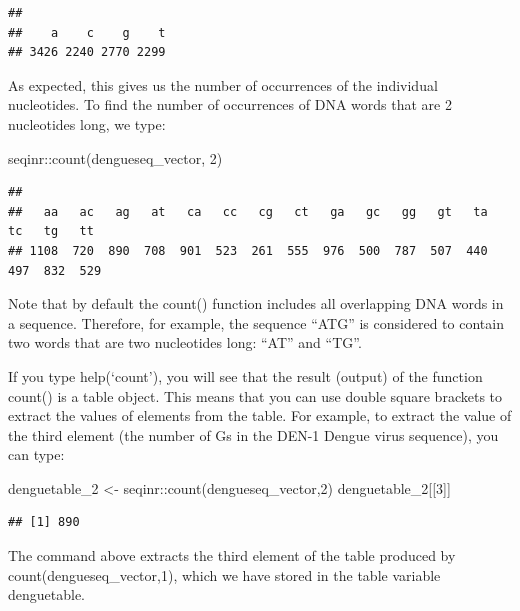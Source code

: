 \documentclass[
]{book}
\newenvironment{Shaded}{\begin{snugshade}}{\end{snugshade}}
\newcommand{\DecValTok}[1]{\textcolor[rgb]{0.00,0.00,0.81}{#1}}
\newcommand{\FunctionTok}[1]{\textcolor[rgb]{0.00,0.00,0.00}{#1}}
\newcommand{\NormalTok}[1]{#1}
\newcommand{\OtherTok}[1]{\textcolor[rgb]{0.56,0.35,0.01}{#1}}
\newcommand{\SpecialCharTok}[1]{\textcolor[rgb]{0.00,0.00,0.00}{#1}}
\begin{document}
\begin{verbatim}
## 
##    a    c    g    t 
## 3426 2240 2770 2299
\end{verbatim}

As expected, this gives us the number of occurrences of the individual nucleotides. To find the number of occurrences of DNA words that are 2 nucleotides long, we type:

\begin{Shaded}
\begin{Highlighting}[]
\NormalTok{seqinr}\SpecialCharTok{::}\FunctionTok{count}\NormalTok{(dengueseq\_vector, }\DecValTok{2}\NormalTok{)}
\end{Highlighting}
\end{Shaded}

\begin{verbatim}
## 
##   aa   ac   ag   at   ca   cc   cg   ct   ga   gc   gg   gt   ta   tc   tg   tt 
## 1108  720  890  708  901  523  261  555  976  500  787  507  440  497  832  529
\end{verbatim}

Note that by default the count() function includes all overlapping DNA words in a sequence. Therefore, for example, the sequence ``ATG'' is considered to contain two words that are two nucleotides long: ``AT'' and ``TG''.

If you type help(`count'), you will see that the result (output) of the function count() is a table object. This means that you can use double square brackets to extract the values of elements from the table. For example, to extract the value of the third element (the number of Gs in the DEN-1 Dengue virus sequence), you can type:

\begin{Shaded}
\begin{Highlighting}[]
\NormalTok{denguetable\_2 }\OtherTok{\textless{}{-}}\NormalTok{ seqinr}\SpecialCharTok{::}\FunctionTok{count}\NormalTok{(dengueseq\_vector,}\DecValTok{2}\NormalTok{)}
\NormalTok{denguetable\_2[[}\DecValTok{3}\NormalTok{]]}
\end{Highlighting}
\end{Shaded}

\begin{verbatim}
## [1] 890
\end{verbatim}

The command above extracts the third element of the table produced by count(dengueseq\_vector,1), which we have stored in the table variable denguetable.
\end{document}
